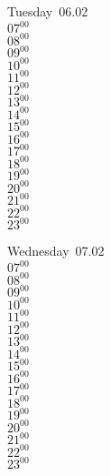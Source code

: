 \documentclass[11pt, a4paper]{book}\usepackage[]{graphicx}\usepackage[]{color}
\begin{document}
\begin{weekdaybox}
  Tuesday~06.02\\
  { 
  \vfill
  $07^{00}$\\
$08^{00}$\\
$09^{00}$\\
$10^{00}$\\
$11^{00}$\\
$12^{00}$\\
$13^{00}$\\
$14^{00}$\\
$15^{00}$\\
$16^{00}$\\
$17^{00}$\\
$18^{00}$\\
$19^{00}$\\
$20^{00}$\\
$21^{00}$\\
$22^{00}$\\
$23^{00}$\\
  }
\end{weekdaybox}
\begin{weekdaybox}
  Wednesday~07.02\\
  { 
  \vfill
  $07^{00}$\\
$08^{00}$\\
$09^{00}$\\
$10^{00}$\\
$11^{00}$\\
$12^{00}$\\
$13^{00}$\\
$14^{00}$\\
$15^{00}$\\
$16^{00}$\\
$17^{00}$\\
$18^{00}$\\
$19^{00}$\\
$20^{00}$\\
$21^{00}$\\
$22^{00}$\\
$23^{00}$\\
  }
\end{weekdaybox}
\clearpage
\begin{headerbox}
\end{headerbox}
\end{document}

